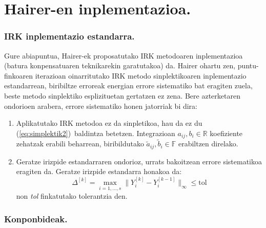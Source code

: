 \section{Hairer-en inplementazioa.}

\subsubsection*{IRK inplementazio estandarra.}

Gure abiapuntua, Hairer-ek \cite{Hairer2008} proposatutako IRK metodoaren inplementazioa (batura konpensatuaren teknikarekin \cite{Higham2002} garatutakoa) da. Hairer ohartu zen, puntu-finkoaren iterazioan oinarritutako IRK metodo sinplektikoaren  inplementazio estandarrean, biribiltze erroreak energian errore sistematiko bat eragiten zuela, beste metodo sinplektiko esplizituetan gertatzen ez zena. Bere azterketaren ondorioen arabera, errore sistematiko honen jatorriak bi dira:

\begin{enumerate}
 \item Aplikatutako IRK metodoa ez da sinpletikoa, hau da ez du (\ref{eq:simplektik2})~baldintza betetzen. Integrazioan $a_{ij}, b_i \in \mathbb{R}$ koefiziente zehatzak erabili beharrean, biribildutako $\tilde a_{ij},\tilde b_i \in \mathbb{F}$ erabiltzen direlako. 
\item Geratze irizpide estandarraren ondorioz, urrats bakoitzean errore sistematikoa eragiten da. Geratze irizpide estandarra honakoa da: 
\begin{equation}
\Delta ^{[k]} = \max_{i=1,\dots,s}\|Y_i^{[k]}-Y_i^{[k-1]}\|_{\infty} \leqslant \text{tol}
\end{equation}
non \emph{tol} finkatutako tolerantzia den.

\end{enumerate}    

\subsubsection*{Konponbideak.}


